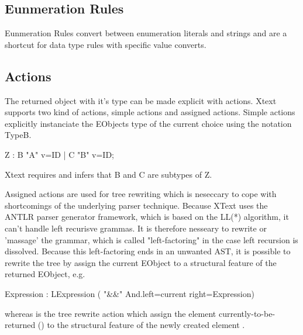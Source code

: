 \subsection{Eunmeration Rules}
Eunmeration Rules convert between enumeration literals and strings and are a shortcut for data type rules with specific value converts.

\subsection{Actions}
The returned object with it's type can be made explicit with actions. Xtext supports two kind of actions, simple actions and assigned actions. Simple actions explicitly instanciate the EObjects type of the current choice using the notation {TypeB}.
\begin{xtxt}
Z 	: 	{B} "A" v=ID
	| 	{C} "B" v=ID;
\end{xtxt}
Xtext requires and infers that B and C are subtypes of Z. 

Assigned actions are used for tree rewriting which is neseccary to cope with shortcomings of the underlying parser technique. Because XText uses the ANTLR parser generator framework, which is based on the LL(*) algorithm, it can't handle left recurisve grammas. It is therefore nesseary to rewrite or 'massage' the grammar, which is called "left-factoring" in the case left recursion is dissolved. Because this left-factoring ends in an unwanted AST, it is possible to rewrite the tree by assign the current EObject to a structural feature of the returned EObject, e.g. 
\begin{xtxt}
Expression 	: 	LExpression 
	 	( "&&" {And.left=current}  right=Expression)
\end{xtxt}
whereas  is the tree rewrite action which assign the element currently-to-be-returned () to the structural feature  of the newly created element .


